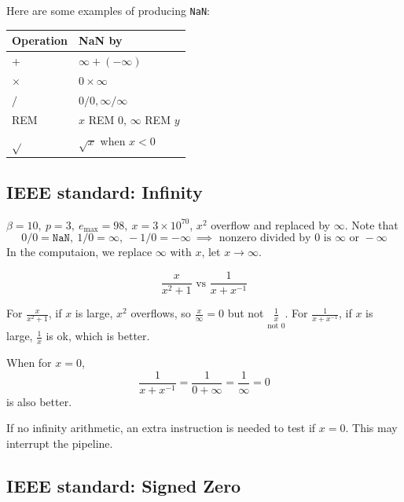 Here are some examples of producing \texttt{NaN}:

\begin{center}
    \begin{tabular}{ll}
        Operation & NaN by \\ \hline
        + & $\infty + (-\infty)$\\
        $\times$ & $0 \times \infty$\\
        $/$ & $0/0, \infty/\infty$\\
        REM & $x$ REM 0, $\infty$ REM $y$ \\
        $\sqrt{}$ & $\sqrt{x}$ when $x < 0$
    \end{tabular}
\end{center}

\subsection{IEEE standard: Infinity}

$\beta = 10,\ p = 3,\ e_{\max} = 98,\ x = 3 \times 10^{70}$,
$x^2$ overflow and replaced by $\infty$. Note that \[
    0/0 = \texttt{NaN},\ 1/0 = \infty,\ -1/0 = -\infty \ \implies \text{ nonzero divided by } 0 \text{ is } \infty \text{ or } -\infty
\]
In the computaion, we replace $\infty$ with $x$, let $x \to \infty$.
\begin{eg}
    $$
    \frac{x}{x^2 + 1} \text{ vs } \frac{1}{x + x^{-1}}
    $$
\end{eg}
\vspace{0.5em}

For $\displaystyle \frac{x}{x^2 + 1}$, if $x$ is large, $x^2$ overflows, so $\displaystyle \frac{x}{\infty} = 0$ but not $\displaystyle \underset{\text{not } 0}{\boxed{\frac{1}{x}}}$.
For $\displaystyle \frac{1}{x + x^{-1}}$, if $x$ is large, $\frac{1}{x}$ is ok, which is better.
\vspace{0.5em}

When for $x = 0$, $$
\frac{1}{x + x^{-1}} = \frac{1}{0 + \infty} = \frac{1}{\infty} = 0
$$ 
is also better.
\begin{note}
    If no infinity arithmetic, an extra instruction is needed to test if $x = 0$. This may interrupt the pipeline.
\end{note}

\subsection{IEEE standard: Signed Zero}

